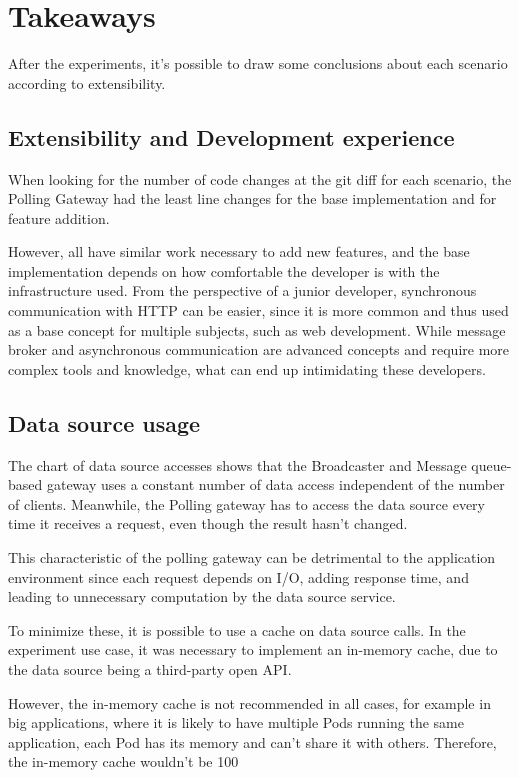 \section{Takeaways}
\label{sec:providerconclusion}

After the experiments, it's possible to draw some conclusions about each scenario according to extensibility.

\subsection*{Extensibility and Development experience}
\label{sec:devex}

When looking for the number of code changes at the git diff for each scenario, the Polling Gateway had the least line changes for the base implementation and for feature addition.

However, all have similar work necessary to add new features, and the base implementation depends on how comfortable the developer is with the infrastructure used. From the perspective of a junior developer, synchronous communication with HTTP can be easier, since it is more common and thus used as a base concept for multiple subjects, such as web development. While message broker and asynchronous communication are advanced concepts and require more complex tools and knowledge, what can end up intimidating these developers.

\subsection*{Data source usage}
\label{sec:source}

The chart of data source accesses shows that the Broadcaster and Message queue-based gateway uses a constant number of data access independent of the number of clients. Meanwhile, the Polling gateway has to access the data source every time it receives a request, even though the result hasn’t changed.

This characteristic of the polling gateway can be detrimental to the application environment since each request depends on I/O, adding response time, and leading to unnecessary computation by the data source service.

To minimize these, it is possible to use a cache on data source calls. In the experiment use case, it was necessary to implement an in-memory cache, due to the data source being a third-party open API. 

However, the in-memory cache is not recommended in all cases, for example in big applications, where it is likely to have multiple Pods running the same application, each Pod has its memory and can't share it with others. Therefore, the in-memory cache wouldn't be 100%

